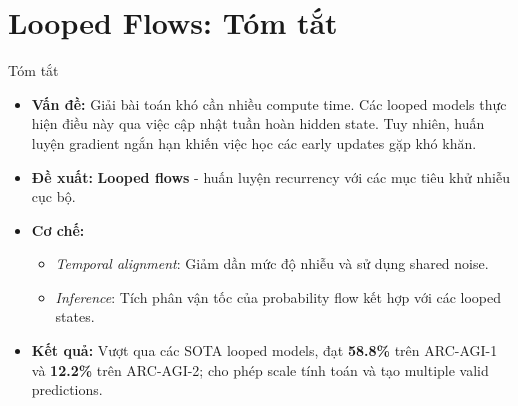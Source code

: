 
\section{Looped Flows: Tóm tắt}
\begin{frame}{Tóm tắt}
    \begin{itemize}
        \item \textbf{Vấn đề:} Giải bài toán khó cần nhiều compute time. Các looped models thực hiện điều này qua việc cập nhật tuần hoàn hidden state. Tuy nhiên, huấn luyện gradient ngắn hạn khiến việc học các early updates gặp khó khăn.
        \item \textbf{Đề xuất:} \textbf{Looped flows} - huấn luyện recurrency với các mục tiêu khử nhiễu cục bộ.
        \item \textbf{Cơ chế:} 
        \begin{itemize}
            \item \textit{Temporal alignment}: Giảm dần mức độ nhiễu và sử dụng shared noise.
            \item \textit{Inference}: Tích phân vận tốc của probability flow kết hợp với các looped states.
        \end{itemize}
        \item \textbf{Kết quả:} Vượt qua các SOTA looped models, đạt \textbf{58.8\%} trên ARC-AGI-1 và \textbf{12.2\%} trên ARC-AGI-2; cho phép scale tính toán và tạo multiple valid predictions.
    \end{itemize}
\end{frame}

